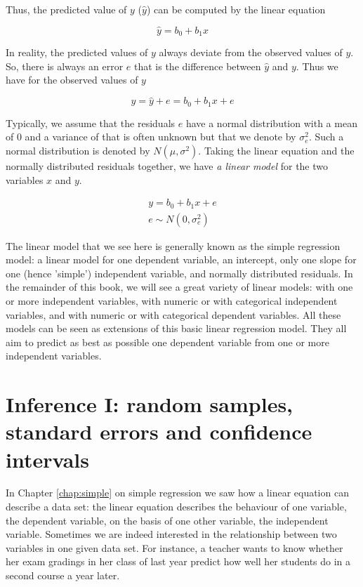 \documentclass[]{book}\usepackage[]{graphicx}\usepackage[]{color}
\begin{document}
Thus, the predicted value of $y$ ($\hat{y}$) can be computed by the linear equation

\begin{equation}
\hat{y}= b_0 + b_1 x
\end{equation}

In reality, the predicted values of $y$ always deviate from the observed values of $y$. So, there is always an error $e$ that is the difference between $\hat{y}$ and $y$. Thus we have for the observed values of $y$

\begin{equation}
y = \hat{y} + e = b_0 + b_1 x + e
\end{equation}

Typically, we assume that the residuals $e$ have a normal distribution with a mean of 0 and a variance of that is often unknown but that we denote by $\sigma^2_e$. Such a normal distribution is denoted by $N(\mu,\sigma^2)$. Taking the linear equation and the normally distributed residuals together, we have \textit{a linear model} for the two variables $x$ and $y$.


\begin{eqnarray}
y = b_0 + b_1 x + e \\
e \sim N(0,\sigma^2_e)
\end{eqnarray}


The linear model that we see here is generally known as the simple regression model: a linear model for one dependent variable, an intercept, only one slope for one (hence 'simple')  independent variable,  and normally distributed residuals. In the remainder of this book, we will see a great variety of linear models: with one or more independent variables, with numeric or with categorical independent variables, and with numeric or with categorical dependent variables. All these models can be seen as extensions of this basic linear regression model. They all aim to predict as best as possible one dependent variable from one or more independent variables. %





\chapter{Inference I: random samples, standard errors and confidence intervals}\label{chap:confidence}

In Chapter \ref{chap:simple} on simple regression we saw how a linear equation can describe a data set: the linear equation describes the behaviour of one variable, the dependent variable, on the basis of one other variable, the independent variable. Sometimes we are indeed interested in the relationship between two variables in one given data set. For instance, a teacher wants to know whether her exam gradings in her class of last year predict how well her students do in a second course a year later.
\end{document}
